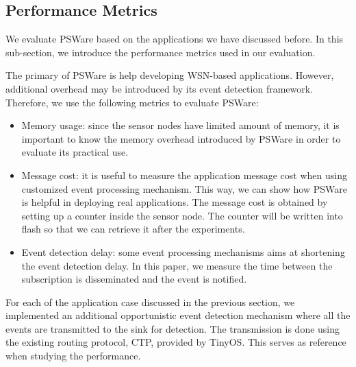 \subsection{Performance Metrics}
We evaluate PSWare based on the applications we have discussed before. In this sub-section, we introduce the performance metrics used in our evaluation.

The primary of PSWare is help developing WSN-based applications. However, additional overhead may be introduced by its event detection framework. Therefore, we use the following metrics to evaluate PSWare:
\begin{itemize}
\item Memory usage: since the sensor nodes have limited amount of memory, it is important to know the memory overhead introduced by PSWare in order to evaluate its practical use. 
\item Message cost: it is useful to measure the application message cost when using customized event processing mechanism. This way, we can show how PSWare is helpful in deploying real applications. The message cost is obtained by setting up a counter inside the sensor node. The counter will be written into flash so that we can retrieve it after the experiments.
\item Event detection delay: some event processing mechanisms aims at shortening the event detection delay. In this paper, we measure the time between the subscription is disseminated and the event is notified.
\end{itemize}

For each of the application case discussed in the previous section, we implemented an additional opportunistic event detection mechanism where all the events are transmitted to the sink for detection. The transmission is done using the existing routing protocol, CTP, provided by TinyOS. This serves as reference when studying the performance.

